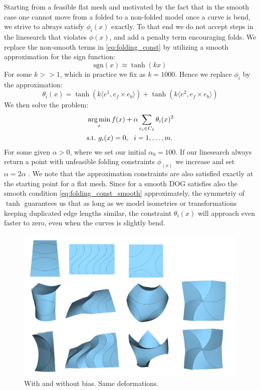 Starting from a feasible flat mesh and motivated by the fact that in the smooth case one cannot move from a folded to a non-folded model once a curve is bend, we strive to always satisfy $\phi_i(x)$ exactly. To that end we do not accept steps in the linesearch that violates $\phi(x)$, and add a penalty term encouraging folds. We replace the non-smooth terms in \eqref{eq:folding_const} by utilizing a smooth approximation for the sign function:
\begin{equation} \label{eq:sign_smooth_approx}
\text{sgn}(x) \approx \tanh(kx)
\end{equation}
For some $k >> 1$, which in practice we fix as $k = 1000$. Hence we replace $\phi_i$ by the approximation:
\begin{equation} \label{eq:folding_const}
\theta_i(x) = \tanh(k\langle e^1,e_f \times e_b \rangle) +  \tanh(k\langle e^2,e_f \times e_b\rangle)
\end{equation}
We then solve the problem:
\begin{equation} \label{eq:const_opt}
\begin{aligned}
& \operatorname*{arg\,min}_x
f(x) + \alpha \sum_{c_i \in C_{I}} \theta_i(x)^2\\
& \textrm{s.t.}
\text{ } g_i(x) = 0, \ \  i = 1, \ldots, m.
\end{aligned}
\end{equation}
For some given $\alpha > 0$, where we set our initial $\alpha_0 = 100$. If our linesearch always return a point with unfeasible folding constraints $\phi_(x)$ we increase and set $\alpha = 2\alpha$ .
We note that the approximation constraints are also satisfied exactly at the starting point for a flat mesh. Since for a smooth DOG satisfies also the smooth condition \eqref{eq:folding_const_smooth} approximately, the symmetriy of $\tanh$ guarantees us that as long as we model isometries or transformations keeping duplicated edge lengths similar, the constraint $\theta_i(x)$ will approach even faster to zero, even when the curves is slightly bend.

\begin{figure} [h]
	\centering
	\includegraphics[width=\linewidth]{figures/fold_bias_compare}
	\caption{With and without bias. Same deformations.  }
	\label{fig:fold_bias_compare}
\end{figure}
